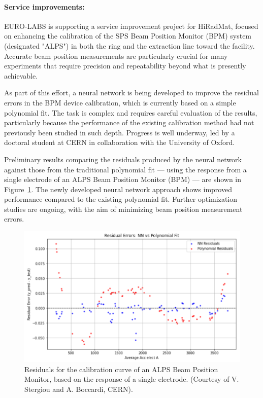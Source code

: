 \paragraph{Service improvements:}

EURO-LABS is supporting a service improvement project for HiRadMat, focused on enhancing the calibration of the SPS Beam Position Monitor (BPM) system (designated "ALPS") in both the ring and the extraction line toward the facility. Accurate beam position measurements are particularly crucial for many experiments that require precision and repeatability beyond what is presently achievable.

As part of this effort, a neural network is being developed to improve the residual errors in the BPM device calibration, which is currently based on a simple polynomial fit. The task is complex and requires careful evaluation of the results, particularly because the performance of the existing calibration method had not previously been studied in such depth. Progress is well underway, led by a doctoral student at CERN in collaboration with the University of Oxford.

Preliminary results comparing the residuals produced by the neural network against those from the traditional polynomial fit — using the response from a single electrode of an ALPS Beam Position Monitor (BPM) — are shown in Figure~\ref{fig:wp3-hrm-si}. The newly developed neural network approach shows improved performance compared to the existing polynomial fit. Further optimization studies are ongoing, with the aim of minimizing beam position measurement errors.

\begin{figure}[!h]
    \centering
    \includegraphics[width=0.75\linewidth]{graphics/hiradmat_SI.png}
    \caption{Residuals for the calibration curve of an ALPS Beam Position Monitor, based on the response of a single electrode.  (Courtesy of V. Stergiou and A. Boccardi, CERN).}
    \label{fig:wp3-hrm-si}
\end{figure}

